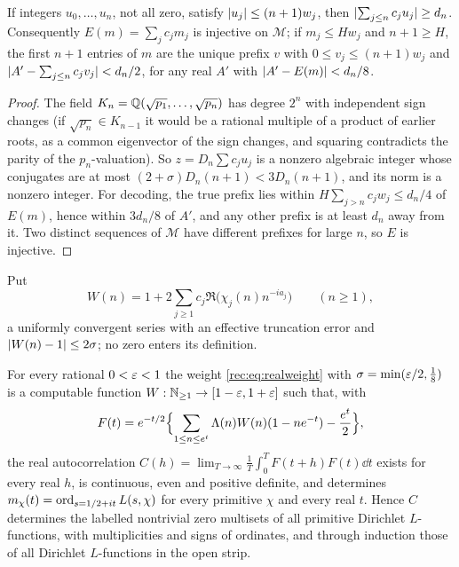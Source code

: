 \begin{lemma}\label{rec:lem:prefix}
If integers $u_0,\dots,u_n$, not all zero, satisfy $\lvert u_j\rvert\le(n+1)w_j$, then
$\lvert\sum_{j\le n}c_ju_j\rvert\ge d_n$. Consequently $E(m)=\sum_jc_jm_j$ is injective on $\mathcal M$; if
$m_j\le Hw_j$ and $n+1\ge H$, the first $n+1$ entries of $m$ are the unique prefix $v$ with
$0\le v_j\le(n+1)w_j$ and $\lvert A'-\sum_{j\le n}c_jv_j\rvert<d_n/2$, for any real $A'$ with
$\lvert A'-E(m)\rvert<d_n/8$.
\end{lemma}

\begin{proof}
The field $K_n=\mathbb{Q}(\sqrt{p_1},\dots,\sqrt{p_n})$ has degree $2^n$ with independent sign changes (if
$\sqrt{p_n}\in K_{n-1}$ it would be a rational multiple of a product of earlier roots, as a common
eigenvector of the sign changes, and squaring contradicts the parity of the $p_n$-valuation). So
$z=D_n\sum c_ju_j$ is a nonzero algebraic integer whose conjugates are at most
$(2+\sigma)D_n(n+1)<3D_n(n+1)$, and its norm is a nonzero integer. For decoding, the true prefix lies
within $H\sum_{j>n}c_jw_j\le d_n/4$ of $E(m)$, hence within $3d_n/8$ of $A'$, and any other prefix is
at least $d_n$ away from it. Two distinct sequences of $\mathcal M$ have different prefixes for large
$n$, so $E$ is injective.
\end{proof}

Put
\begin{equation}\label{rec:eq:realweight}
 W(n)=1+2\sum_{j\ge1}c_j\Re\bigl(\chi_j(n)n^{-ia_j}\bigr)\qquad(n\ge1),
\end{equation}
a uniformly convergent series with an effective truncation error and $\lvert W(n)-1\rvert\le2\sigma$; no zero
enters its definition.

\begin{theorem}\label{rec:thm:universal}
For every rational $0<\varepsilon<1$ the weight \eqref{rec:eq:realweight} with $\sigma=\min(\varepsilon/2,\tfrac18)$ is a
computable function $W:\mathbb{N}_{\ge1}\to[1-\varepsilon,1+\varepsilon]$ such that, with
\[
 F(t)=e^{-t/2}\Bigl\{\sum_{1\le n\le e^t}\Lambda(n)W(n)(1-ne^{-t})-\frac{e^t}2\Bigr\},
\]
the real autocorrelation $C(h)=\lim_{T\to\infty}\frac1T\int_0^TF(t+h)F(t)\dd t$ exists for every real $h$, is
continuous, even and positive definite, and determines $m_\chi(t)=\operatorname{ord}_{s=1/2+it}L(s,\chi)$ for every
primitive $\chi$ and every real $t$. Hence $C$ determines the labelled nontrivial zero multisets of all
primitive Dirichlet $L$-functions, with multiplicities and signs of ordinates, and through induction
those of all Dirichlet $L$-functions in the open strip.
\end{theorem}


